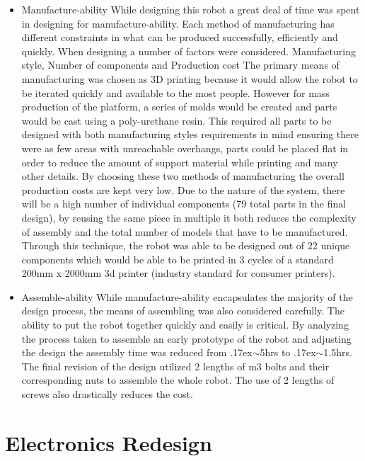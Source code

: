 \documentclass[12pt]{report}
\newcommand{\approximately}{{\raise.17ex\hbox{$\scriptstyle\mathtt{\sim}$}}}
\begin{document}
\begin{itemize}
\begin{table}[H]
                \caption{\label{tab:DHParametersLeg}D-H Parameters of a single leg}
        \end{table}
        \item Manufacture-ability
        While designing this robot a great deal of time was spent in designing for manufacture-ability. Each method of manufacturing has different constraints in what can be produced successfully, efficiently and quickly. When designing a number of factors were considered. Manufacturing style, Number of components and Production cost
        The primary means of manufacturing was chosen as 3D printing because it would allow the robot to be iterated quickly and available to the most people. However for mass production of the platform, a series of molds would be created and parts would be cast using a poly-urethane resin. This required all parts to be designed with both manufacturing styles requirements in mind ensuring there were as few areas with unreachable overhangs, parts could be placed flat in order to reduce the amount of support material while printing and many other details. By choosing these two methods of manufacturing the overall production costs are kept very low.\newline
        Due to the nature of the system, there will be a high number of individual components (79 total parts in the final design), by reusing the same piece in multiple it both reduces the complexity of assembly and the total number of models that have to be manufactured. Through this technique, the robot was able to be designed out of 22 unique components which would be able to be printed in 3 cycles of a standard 200mm x 2000mm 3d printer (industry standard for consumer printers).\newline
        \item Assemble-ability
        While manufacture-ability encapsulates the majority of the design process, the means of assembling was also considered carefully. The ability to put the robot together quickly and easily is critical. By analyzing the process taken to assemble an early prototype of the robot and adjusting the design the assembly time was reduced from \approximately 5hrs to \approximately1.5hrs. The final revision of the design utilized 2 lengths of m3 bolts and their corresponding nuts to assemble the whole robot. The use of 2 lengths of screws also drastically reduces the cost. 
        
    \end{itemize}
    
\chapter{Electronics Redesign}
\end{document}
